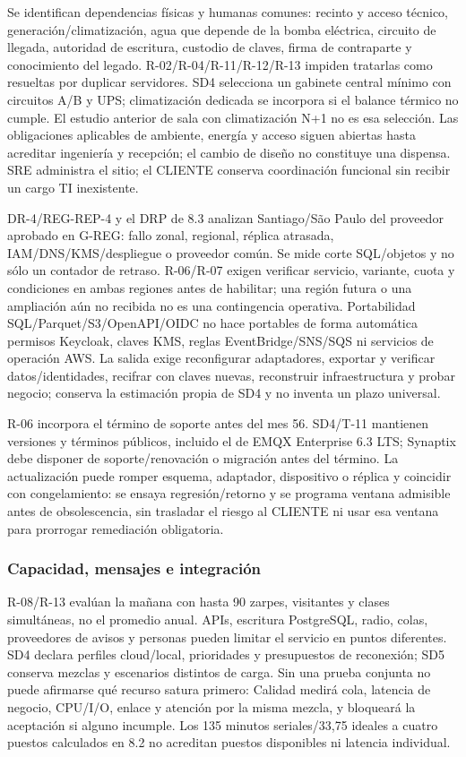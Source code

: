 Se identifican dependencias físicas y humanas comunes: recinto y acceso técnico, generación/climatización, agua que depende de la bomba eléctrica, circuito de llegada, autoridad de escritura, custodio de claves, firma de contraparte y conocimiento del legado. R-02/R-04/R-11/R-12/R-13 impiden tratarlas como resueltas por duplicar servidores. SD4 selecciona un gabinete central mínimo con circuitos A/B y UPS; climatización dedicada se incorpora si el balance térmico no cumple. El estudio anterior de sala con climatización N+1 no es esa selección. Las obligaciones aplicables de ambiente, energía y acceso siguen abiertas hasta acreditar ingeniería y recepción; el cambio de diseño no constituye una dispensa. SRE administra el sitio; el CLIENTE conserva coordinación funcional sin recibir un cargo TI inexistente.

DR-4/REG-REP-4 y el DRP de 8.3 analizan Santiago/São Paulo del proveedor aprobado en G-REG: fallo zonal, regional, réplica atrasada, IAM/DNS/KMS/despliegue o proveedor común. Se mide corte SQL/objetos y no sólo un contador de retraso. R-06/R-07 exigen verificar servicio, variante, cuota y condiciones en ambas regiones antes de habilitar; una región futura o una ampliación aún no recibida no es una contingencia operativa. Portabilidad SQL/Parquet/S3/OpenAPI/OIDC no hace portables de forma automática permisos Keycloak, claves KMS, reglas EventBridge/SNS/SQS ni servicios de operación AWS. La salida exige reconfigurar adaptadores, exportar y verificar datos/identidades, recifrar con claves nuevas, reconstruir infraestructura y probar negocio; conserva la estimación propia de SD4 y no inventa un plazo universal.

R-06 incorpora el término de soporte antes del mes 56. SD4/T-11 mantienen versiones y términos públicos, incluido el de EMQX Enterprise 6.3 LTS; Synaptix debe disponer de soporte/renovación o migración antes del término. La actualización puede romper esquema, adaptador, dispositivo o réplica y coincidir con congelamiento: se ensaya regresión/retorno y se programa ventana admisible antes de obsolescencia, sin trasladar el riesgo al CLIENTE ni usar esa ventana para prorrogar remediación obligatoria.

\subsubsection{Capacidad, mensajes e integración}
R-08/R-13 evalúan la mañana con hasta 90 zarpes, visitantes y clases simultáneas, no el promedio anual. APIs, escritura PostgreSQL, radio, colas, proveedores de avisos y personas pueden limitar el servicio en puntos diferentes. SD4 declara perfiles cloud/local, prioridades y presupuestos de reconexión; SD5 conserva mezclas y escenarios distintos de carga. Sin una prueba conjunta no puede afirmarse qué recurso satura primero: Calidad medirá cola, latencia de negocio, CPU/I/O, enlace y atención por la misma mezcla, y bloqueará la aceptación si alguno incumple. Los 135 minutos seriales/33,75 ideales a cuatro puestos calculados en 8.2 no acreditan puestos disponibles ni latencia individual.

